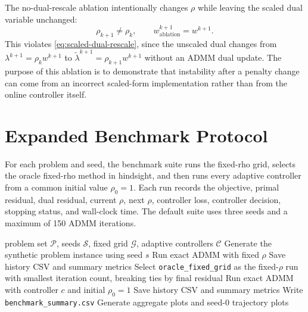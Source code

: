 \documentclass[11pt]{article}
\begin{document}
The no-dual-rescale ablation intentionally changes $\rho$ while leaving the
scaled dual variable unchanged:
\begin{equation}
    \rho_{k+1}\neq\rho_k,
    \qquad
    w^{k+1}_{\mathrm{ablation}}=w^{k+1}.
\end{equation}
This violates \eqref{eq:scaled-dual-rescale}, since the unscaled dual changes
from $\lambda^{k+1}=\rho_k w^{k+1}$ to
$\widetilde{\lambda}^{k+1}=\rho_{k+1}w^{k+1}$ without an ADMM dual update.
The purpose of this ablation is to demonstrate that instability after a
penalty change can come from an incorrect scaled-form implementation rather
than from the online controller itself.

\section{Expanded Benchmark Protocol}

For each problem and seed, the benchmark suite runs the fixed-rho grid, selects
the oracle fixed-rho method in hindsight, and then runs every adaptive
controller from a common initial value $\rho_0=1$.  Each run records the
objective, primal residual, dual residual, current $\rho$, next $\rho$,
controller loss, controller decision, stopping status, and wall-clock time.
The default suite uses three seeds and a maximum of 150 ADMM iterations.

\begin{algorithm}[t]
\caption{Expanded benchmark suite}
\label{alg:benchmark-suite}
\begin{algorithmic}[1]
\Require problem set $\mathcal{P}$, seeds $\mathcal{S}$, fixed grid
         $\mathcal{G}$, adaptive controllers $\mathcal{C}$
        \State Generate the synthetic problem instance using seed $s$
            \State Run exact ADMM with fixed $\rho$
            \State Save history CSV and summary metrics
        \EndFor
        \State Select \texttt{oracle\_fixed\_grid} as the fixed-$\rho$ run
               with smallest iteration count, breaking ties by final residual
            \State Run exact ADMM with controller $c$ and initial $\rho_0=1$
            \State Save history CSV and summary metrics
        \EndFor
    \EndFor
\EndFor
\State Write \texttt{benchmark\_summary.csv}
\State Generate aggregate plots and seed-0 trajectory plots
\end{algorithmic}
\end{algorithm}
\end{document}
